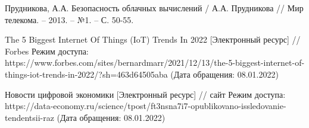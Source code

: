 \begingroup
\renewcommand{\section}[2]{\anonsection{СПИСОК ИСПОЛЬЗОВАННЫХ ИСТОЧНИКОВ}}
\begin{thebibliography}{00}

    Прудникова, А.А.
    Безопасность облачных вычислений /
    А.А. Прудникова //
    Мир телекома. -- 2013. -- №1. -- С. 50-55.

    The 5 Biggest Internet Of Things (IoT) Trends In 2022
    [Электронный ресурс] //
    Forbes
    Режим доступа: https://www.forbes.com/sites/bernardmarr/2021/12/13/the-5-biggest-internet-of-things-iot-trends-in-2022/?sh=463d64505aba
    (Дата обращения: 08.01.2022)

    Новости цифровой экономики
    [Электронный ресурс] //
    сайт
    Режим доступа: https://data-economy.ru/science/tpost/ft3nsna7i7-opublikovano-issledovanie-tendentsii-raz
    (Дата обращения: 08.01.2022)


\end{thebibliography}
\endgroup

\clearpage
